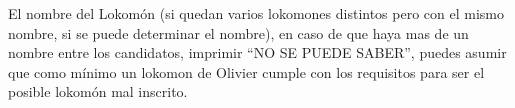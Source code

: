 \documentclass{oci}
\begin{document}
\begin{outputDescription}
El nombre del Lokomón (si quedan varios lokomones distintos pero con el mismo nombre, si se puede determinar el nombre), en caso de que haya mas de un nombre entre los candidatos, imprimir “NO SE PUEDE SABER”, puedes asumir que como mínimo un lokomon de Olivier cumple con los requisitos para ser el posible lokomón mal inscrito.
\end{outputDescription}

\begin{sampleDescription}
\end{sampleDescription}
\end{document}
